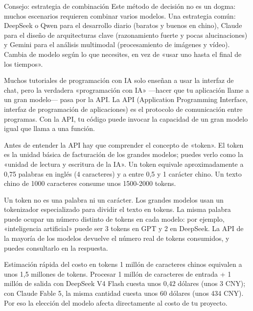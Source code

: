 \begin{tcbinfo}{Consejo: estrategia de combinación}
Este método de decisión no es un dogma: muchos escenarios requieren combinar varios modelos. Una estrategia común: DeepSeek o Qwen para el desarrollo diario (baratos y buenos en chino), Claude para el diseño de arquitecturas clave (razonamiento fuerte y pocas alucinaciones) y Gemini para el análisis multimodal (procesamiento de imágenes y vídeo). Cambia de modelo según lo que necesites, en vez de «usar uno hasta el final de los tiempos».

\end{tcbinfo}


Muchos tutoriales de programación con IA solo enseñan a usar la interfaz de chat, pero la verdadera «programación con IA» —hacer que tu aplicación llame a un gran modelo— pasa por la API. La API (Application Programming Interface, interfaz de programación de aplicaciones) es el protocolo de comunicación entre programas. Con la API, tu código puede invocar la capacidad de un gran modelo igual que llama a una función.


Antes de entender la API hay que comprender el concepto de «token». El token es la unidad básica de facturación de los grandes modelos; puedes verlo como la «unidad de lectura y escritura de la IA». Un token equivale aproximadamente a 0,75 palabras en inglés (4 caracteres) y a entre 0,5 y 1 carácter chino. Un texto chino de 1000 caracteres consume unos 1500-2000 tokens.

Un token no es una palabra ni un carácter. Los grandes modelos usan un tokenizador especializado para dividir el texto en tokens. La misma palabra puede ocupar un número distinto de tokens en cada modelo: por ejemplo, «inteligencia artificial» puede ser 3 tokens en GPT y 2 en DeepSeek. La API de la mayoría de los modelos devuelve el número real de tokens consumidos, y puedes consultarlo en la respuesta.

\begin{tcbinfo}{Estimación rápida del costo en tokens}
1 millón de caracteres chinos equivalen a unos 1,5 millones de tokens. Procesar 1 millón de caracteres de entrada + 1 millón de salida con DeepSeek V4 Flash cuesta unos 0,42 dólares (unos 3 CNY); con Claude Fable 5, la misma cantidad cuesta unos 60 dólares (unos 434 CNY). Por eso la elección del modelo afecta directamente al costo de tu proyecto.

\end{tcbinfo}

